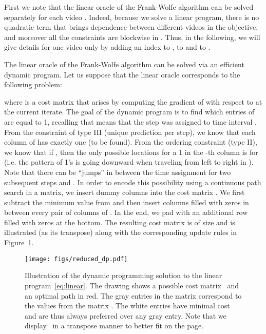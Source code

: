 \documentclass[10pt,twocolumn,letterpaper]{article}
\begin{document}
First we note that the linear oracle of the Frank-Wolfe algorithm can be solved separately for each video .
Indeed, because we solve a linear program, there is no quadratic term that brings dependence between different videos in the objective, and moreover all the constraints are blockwise in .
Thus, in the following, we will give details for one video only by adding an index  to , to  and to .

The linear oracle of the Frank-Wolfe algorithm can be solved via an efficient dynamic program.
Let us suppose that the linear oracle corresponds to the following problem: 

where  is a cost matrix that arises by computing the gradient of  with respect to  at the current iterate. The goal of the dynamic program is to find which entries of  are equal to 1, recalling that  means that the step  was assigned to time interval . From the constraint of type III (unique prediction per step), we know that each column  of  has exactly one  (to be found). From the ordering constraint (type II), we know that if , then the only possible locations for a 1 in the -th column is for  (i.e. the pattern of 1's is going downward when traveling from left to right in ). Note that there can be ``jumps'' in between the time assignment for two subsequent steps  and . In order to encode this possibility using a continuous path search in a matrix, we insert dummy columns into the cost matrix .
We first subtract the minimum value from  and then insert columns filled with zeros in between every pair of columns of .
In the end, we pad  with an additional row filled with zeros at the bottom.
The resulting cost matrix  is of size  and is illustrated (as its transpose) along with the corresponding update rules in Figure~\ref{fig:dp}.

\begin{figure}[tbp]
    \centering
    \texttt{[image: figs/reduced\_dp.pdf]}



    \caption{
        Illustration of the dynamic programming solution to the linear program~\eqref{eq:linear}.
        The drawing shows a possible cost matrix~ and an optimal path in red.
        The gray entries in the matrix  correspond to the values from the matrix . The white entries have minimal cost and are thus always preferred over any gray entry. 
        Note that we display~ in a transpose manner to better fit on the page.
}
    \label{fig:dp}



\end{figure}
\end{document}
